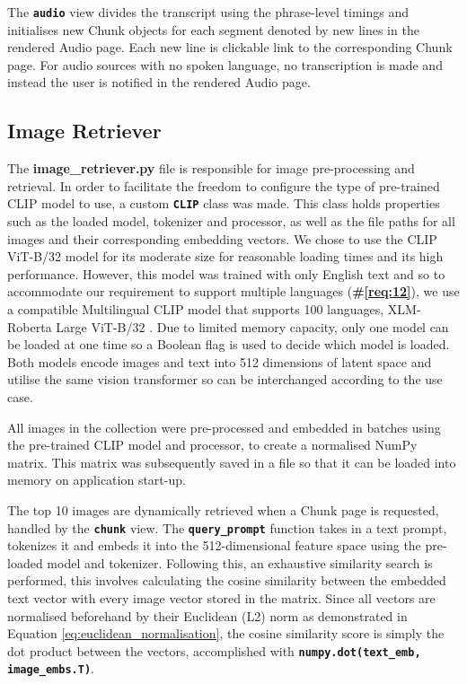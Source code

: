 \documentclass{l4proj}
\begin{document}
The \textbf{\lstinline|audio|} view divides the transcript using the phrase-level timings and initialises new Chunk objects for each segment denoted by new lines in the rendered Audio page. Each new line is clickable link to the corresponding Chunk page. For audio sources with no spoken language, no transcription is made and instead the user is notified in the rendered Audio page.


\subsection{Image Retriever}
The \textbf{image\_retriever.py} file is responsible for image pre-processing and retrieval. In order to facilitate the freedom to configure the type of pre-trained CLIP model to use, a custom \textbf{\lstinline{CLIP}} class was made. This class holds properties such as the loaded model, tokenizer and processor, as well as the file paths for all images and their corresponding embedding vectors. We chose to use the CLIP ViT-B/32 model for its moderate size for reasonable loading times and its high performance. However, this model was trained with only English text and so to accommodate our requirement to support multiple languages (\textbf{\#\ref{req:12}}), we use a compatible Multilingual CLIP model that supports 100 languages, XLM-Roberta Large ViT-B/32 \citep{mclip}. Due to limited memory capacity, only one model can be loaded at one time so a Boolean flag is used to decide which model is loaded. Both models encode images and text into 512 dimensions of latent space and utilise the same vision transformer so can be interchanged according to the use case.

All images in the collection were pre-processed and embedded in batches using the pre-trained CLIP model and processor, to create a normalised NumPy matrix. This matrix was subsequently saved in a file so that it can be loaded into memory on application start-up. 

\label{sec:image_retriever:par:query_prompt}
The top 10 images are dynamically retrieved when a Chunk page is requested, handled by the \textbf{\lstinline{chunk}} view. The \textbf{\lstinline{query_prompt}} function takes in a text prompt, tokenizes it and embeds it into the 512-dimensional feature space using the pre-loaded model and tokenizer. Following this, an exhaustive similarity search is performed, this involves calculating the cosine similarity between the embedded text vector with every image vector stored in the matrix. Since all vectors are normalised beforehand by their Euclidean (L2) norm as demonstrated in Equation \ref{eq:euclidean_normalisation}, the cosine similarity score is simply the dot product between the vectors, accomplished with \textbf{\lstinline{numpy.dot(text_emb, image_embs.T)}}. 
\end{document}

